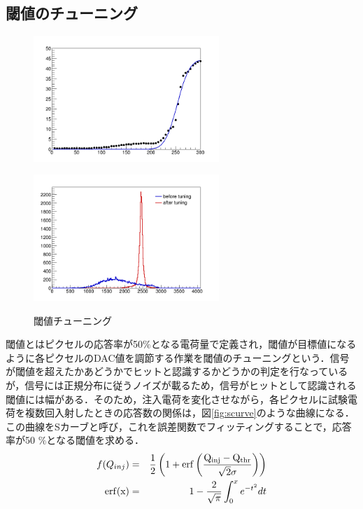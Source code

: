 \subsection{閾値のチューニング}
\begin{figure}[h]
  \centering
  \begin{minipage}[b]{0.4\linewidth}
    \centering
    \includegraphics[width=7cm]{./figure/scurve.png}
    \label{fig:scurve}
  \end{minipage}
  \begin{minipage}[b]{0.4\linewidth}
    \includegraphics[width=7cm]{./figure/ThreDiff.png}
    \label{fig:ThrDistBefore}
  \end{minipage}
  \caption{閾値チューニング}
\end{figure}

閾値とはピクセルの応答率が50$\mathrm{\%}$となる電荷量で定義され，閾値が目標値になるように各ピクセルのDAC値を調節する作業を閾値のチューニングという．信号が閾値を超えたかあどうかでヒットと認識するかどうかの判定を行なっているが，信号には正規分布に従うノイズが載るため，信号がヒットとして認識される閾値には幅がある．そのため，注入電荷を変化させながら，各ピクセルに試験電荷を複数回入射したときの応答数の関係は，図\ref{fig:scurve}のような曲線になる．この曲線をSカーブと呼び，これを誤差関数でフィッティングすることで，応答率が50 $\mathrm{\%}$となる閾値を求める．
\begin{eqnarray}
  f(Q_{inj}) &=& \frac{1}{2} \left( 1 + \rm{erf} \left( \frac{Q_{inj} - Q_{thr}}{\sqrt{2} \sigma} \right) \right) \\
  \rm{erf}(x) &=& 1- \frac{2}{\sqrt{\pi}} \int^x _0 e^{-t^2} dt
  \label{eq:scurve}
\end{eqnarray}


